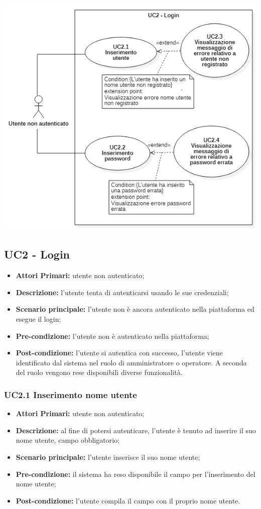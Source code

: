 
 \includegraphics{res/img/caso_duso_login.png}
\subsection{UC2 - Login}
\begin{itemize}
	\item \textbf{Attori Primari:} utente non autenticato;
	\item \textbf{Descrizione:} l'utente tenta di autenticarsi usando le sue credenziali;
	\item \textbf{Scenario principale:} l'utente non è ancora autenticato nella piattaforma ed esegue il login;
	\item \textbf{Pre-condizione:} l'utente non è autenticato nella piattaforma;
	\item \textbf{Post-condizione:} l'utente si autentica con successo, l'utente viene identificato dal sistema nel ruolo di amministratore o operatore. A seconda del ruolo vengono rese disponibili diverse funzionalità.
\end{itemize}

\subsubsection{UC2.1 Inserimento nome utente}
\begin{itemize}
	\item \textbf{Attori Primari:} utente non autenticato;
	\item \textbf{Descrizione:} al fine di potersi autenticare, l'utente è tenuto ad inserire il suo nome utente, campo obbligatorio;
	\item \textbf{Scenario principale:} l'utente inserisce il suo nome utente;
	\item \textbf{Pre-condizione:} il sistema ha reso disponibile il campo per l'inserimento del nome utente;
	\item \textbf{Post-condizione:} l'utente compila il campo con il proprio nome utente.
\end{itemize}	

